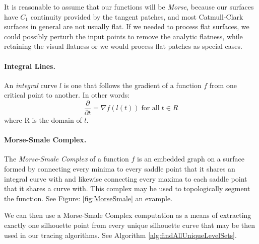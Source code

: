 \documentclass[12pt, letterpaper]{article}
\begin{document}
	It is reasonable to assume that our functions will be \emph{Morse}, because our surfaces have $C_{1}$ continuity provided by the tangent patches,
	and most Catmull-Clark surfaces in general are not usually flat. If we needed to process flat surfaces, we could possibly perturb the input points to
	remove the analytic flatness, while retaining the visual flatness or we would process flat patches as special cases.

	\paragraph{Integral Lines.}

	An \emph{integral} curve $l$ is one that follows the gradient of a function $f$ from one critical point to another.
	In other words: $$\frac{\partial}{\partial t} = \nabla f(l(t)) \; \text{for all} \; t \in R$$ where R is the domain of $l$.

	\paragraph{Morse-Smale Complex.}
	The \emph{Morse-Smale Complex} of a function $f$ is an embedded graph on a surface formed by connecting every minima to every saddle point that it shares an 
	integral curve with and likewise connecting every maxima to each saddle point that it shares a curve with. This complex may be used to topologically segment
	the function. See Figure: \ref{fig:MorseSmale} an example.

	We can then use a Morse-Smale Complex computation as a means of extracting exactly one silhouette point from every unique silhouette curve that may
	be then used in our tracing algorithms. See Algorithm \ref{alg:findAllUniqueLevelSets}.
\end{document}
